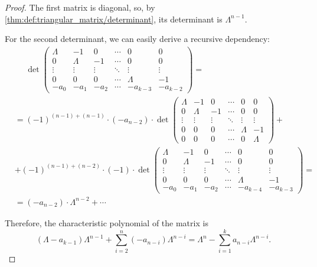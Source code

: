 \begin{proof}
  The first matrix is diagonal, so, by \cref{thm:def:triangular_matrix/determinant}, its determinant is \( \Lambda^{n-1} \).

  For the second determinant, we can easily derive a recursive dependency:
  \begin{align*}
    &\phantom{{}={}}
    \det \begin{pmatrix}
      \Lambda & -1      & 0       & \cdots & 0        & 0      \\
      0       & \Lambda & -1      & \cdots & 0        & 0      \\
      \vdots  & \vdots  & \vdots  & \ddots & \vdots   & \vdots \\
      0       & 0       & 0       & \cdots & \Lambda  & -1     \\
      -a_0    & -a_1    & -a_2    & \cdots & -a_{k-3} & -a_{k-2}
    \end{pmatrix}
    = \\ &=
    (-1)^{(n-1)+(n-1)} \cdot (-a_{n-2}) \cdot
    \det \begin{pmatrix}
      \Lambda & -1      & 0       & \cdots & 0       & 0      \\
      0       & \Lambda & -1      & \cdots & 0       & 0      \\
      \vdots  & \vdots  & \vdots  & \ddots & \vdots  & \vdots \\
      0       & 0       & 0       & \cdots & \Lambda & -1     \\
      0       & 0       & 0       & \cdots & 0       & \Lambda
    \end{pmatrix}
    + \\ &+
    (-1)^{(n-1)+(n-2)} \cdot (-1) \cdot
    \det \begin{pmatrix}
      \Lambda & -1      & 0       & \cdots & 0        & 0      \\
      0       & \Lambda & -1      & \cdots & 0        & 0      \\
      \vdots  & \vdots  & \vdots  & \ddots & \vdots   & \vdots \\
      0       & 0       & 0       & \cdots & \Lambda  & -1     \\
      -a_0    & -a_1    & -a_2    & \cdots & -a_{k-4} & -a_{k-3}
    \end{pmatrix}
    = \\ &=
    (-a_{n-2}) \cdot \Lambda^{n-2} + \cdots
  \end{align*}

  Therefore, the characteristic polynomial of the matrix is
  \begin{equation*}
    (\Lambda - a_{k-1}) \Lambda^{n-1} + \sum_{i=2}^n (-a_{n-i}) \Lambda^{n-i}
    =
    \Lambda^n - \sum_{i=1}^k a_{n-i} \Lambda^{n-i}.
  \end{equation*}
\end{proof}

